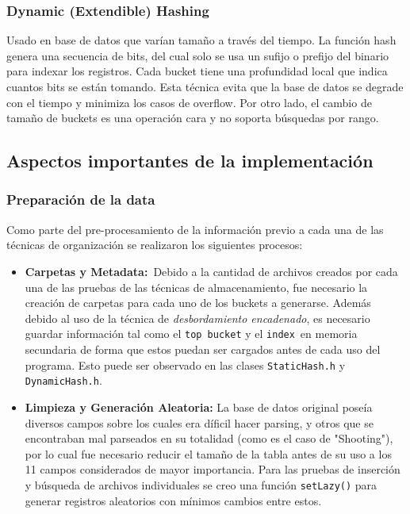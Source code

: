\documentclass{article}
\begin{document}
      \subsubsection{Dynamic (Extendible) Hashing}

        Usado en base de datos que varían tamaño a través del tiempo. La función hash genera una secuencia de bits, del cual solo se usa un sufijo o prefijo del binario para indexar los registros. Cada bucket tiene una profundidad local que indica cuantos bits se están tomando. Esta técnica evita que la base de datos se degrade con el tiempo y minimiza los casos de overflow. Por otro lado, el cambio de tamaño de buckets es una operación cara y no soporta búsquedas por rango.

    \subsection{Aspectos importantes de la implementación}
        
      \subsubsection{Preparación de la data} 
        
        Como parte del pre-procesamiento de la información previo a cada una de las técnicas de organización se realizaron los siguientes procesos: 

        \begin{itemize}

          \item \textbf{Carpetas y Metadata:} Debido a la cantidad de archivos creados por cada una de las pruebas de las técnicas de almacenamiento, fue necesario la creación de carpetas para cada uno de los buckets a generarse. Además debido al uso de la técnica de \textit{desbordamiento encadenado}, es necesario guardar información tal como el \texttt{top bucket} y el \texttt{index} en memoria secundaria de forma que estos puedan ser cargados antes de cada uso del programa. Esto puede ser observado en las clases \texttt{StaticHash.h} y \texttt{DynamicHash.h}. 

          \item \textbf{Limpieza y Generación Aleatoria:} La base de datos original poseía diversos campos sobre los cuales era díficil hacer parsing, y otros que se encontraban mal parseados en su totalidad (como es el caso de "Shooting"), por lo cual fue necesario reducir el tamaño de la tabla antes de su uso a los 11 campos considerados de mayor importancia. Para las pruebas de inserción y búsqueda de archivos individuales se creo una función \texttt{setLazy()} para generar registros aleatorios con mínimos cambios entre estos.

        \end{itemize}
\end{document}

